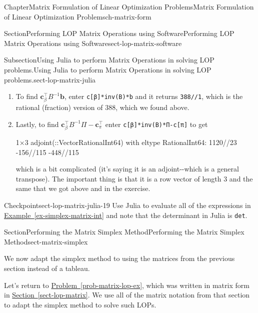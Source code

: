 \documentclass[oneside,10pt,]{book}
\newcommand{\xreffont}{\relax}
\newcommand{\mono}[1]{\texttt{#1}}
\numberwithin{equation}{section}
\begin{document}
\begin{chapterptx}{Chapter}{Matrix Formulation of Linear Optimization Problems}{}{Matrix Formulation of Linear Optimization Problems}{}{}{ch-matrix-form}
\begin{sectionptx}{Section}{Performing LOP Matrix Operations using Software}{}{Performing LOP Matrix Operations using Software}{}{}{sect-lop-matrix-software}
\begin{subsectionptx}{Subsection}{Using Julia to perform Matrix Operations in solving LOP problems.}{}{Using Julia to perform Matrix Operations in solving LOP problems.}{}{}{sect-lop-matrix-julia}
\begin{enumerate}
\par
%
\begin{codedisplay}
4×3 Matrix{Rational{Int64}}:
  -25//46   -3//46     1//23
   34//23    2//115   -9//115
 -142//23   39//115  112//115
  482//23  142//115  -64//115
\end{codedisplay}
%
\item{}To find \(\boldsymbol{c}_{\beta}^{\intercal}B^{-1}\boldsymbol{b}\), enter \mono{c[β]\textquotesingle{}*inv(B)*b} and it returns \mono{388//1}, which is the rational (fraction) version of 388, which we found above.%
\item{}Lastly, to find \(\boldsymbol{c}_{\beta}^{\intercal}B^{-1}\Pi - \boldsymbol{c}_{\pi}^{\intercal}\) enter \mono{c[β]\textquotesingle{}*inv(B)*Π-c[π]\textquotesingle{}} to get%
\par
%
\begin{codedisplay}
1×3 adjoint(::Vector{Rational{Int64}}) with eltype Rational{Int64}:
 1120//23  -156//115  -448//115
\end{codedisplay}
%
\par
which is a bit complicated (it's saying it is an adjoint-{}-{}which is a general transpose). The important thing is that it is a row vector of length 3 and the same that we got above and in the exercise.%
\end{enumerate}
%
\begin{inlineexercise}{Checkpoint}{}{sect-lop-matrix-julia-19}%
Use Julia to evaluate all of the expressions in \hyperref[ex-simplex-matrix-int]{Example~{\xreffont\ref{ex-simplex-matrix-int}}} and note that the determinant in Julia is \mono{det}.%
\end{inlineexercise}%
\end{subsectionptx}
\end{sectionptx}
%
%
\typeout{************************************************}
\typeout{************************************************}
%
\begin{sectionptx}{Section}{Performing the Matrix Simplex Method}{}{Performing the Matrix Simplex Method}{}{}{sect-matrix-simplex}
\begin{introduction}{}%
We now adapt the simplex method to using the matrices from the previous section instead of a tableau.%
\par
Let's return to \hyperref[prob-matrix-lop-ex]{Problem~{\xreffont\ref{prob-matrix-lop-ex}}}, which was written in matrix form in \hyperref[sect-lop-matrix]{Section~{\xreffont\ref{sect-lop-matrix}}}. We use all of the matrix notation from that section to adapt the simplex method to solve such LOPs.%

\end{introduction}
\end{sectionptx}
\end{chapterptx}
\end{document}
